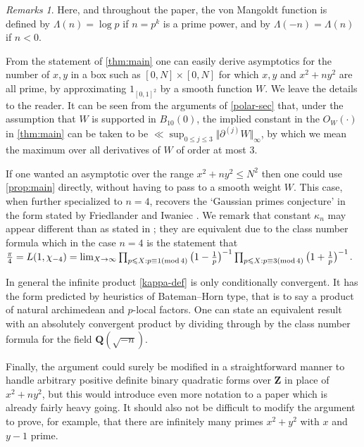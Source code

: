 \documentclass[11pt,reqno]{amsart}
\numberwithin{equation}{section}
\theoremstyle{definition}
\theoremstyle{remark}
\newtheorem*{remarks}{Remarks}
\renewcommand{\le}{\leqslant}
\newcommand\Z{\mathbf{Z}}
\newcommand\Q{\mathbf{Q}}
\newcommand{\mdsub}[1]{\ensuremath{(\mbox{\scriptsize mod}\, #1)}}
\begin{document}
\begin{remarks} 
Here, and throughout the paper, the von Mangoldt function is defined by $\Lambda(n) = \log p$ if $n = p^k$ is a prime power, and by $\Lambda(-n) = \Lambda(n)$ if $n < 0$. 

From the statement of \cref{thm:main} one can easily derive asymptotics for the number of $x,y$ in a box such as $[0,N] \times [0,N]$ for which $x,y$ and $x^2 + ny^2$ are all prime, by approximating $1_{[0,1]^2}$ by a smooth function $W$. We leave the details to the reader. It can be seen from the arguments of \cref{polar-sec} that, under the assumption that $W$ is supported in $B_{10}(0)$, the implied constant in the $O_W( \cdot )$ in \cref{thm:main} can be taken to be $\ll \sup_{0 \le j \le 3}\Vert \partial^{(j)}W  \Vert_{\infty}$, by which we mean the maximum over all derivatives of $W$ of order at most $3$. 

If one wanted an asymptotic over the range $x^2 + ny^2 \le N^2$ then one could use \cref{prop:main} directly, without having to pass to a smooth weight $W$. This case, when further specialized to $n=4$, recovers the `Gaussian primes conjecture' in the form stated by Friedlander and Iwaniec \cite[Conjecture 1.1]{FI22}. We remark that constant $\kappa_n$ may appear different than as stated in \cite{FI22}; they are equivalent due to the class number formula which in the case $n = 4$ is the statement that $\frac{\pi}{4} =  L(1,\chi_{-4}) = \lim_{X \rightarrow \infty}\prod_{p \le X : p \equiv 1 \mdsub{4}} \big(1 - \frac{1}{p}\big)^{-1} \prod_{p \le X: p \equiv 3 \mdsub 4}\big(1 + \frac{1}{p}\big)^{-1}$. 

In general the infinite product \cref{kappa-def} is only conditionally convergent.  It has the form predicted by heuristics of Bateman--Horn type, that is to say a product of natural archimedean and $p$-local factors. One can state an equivalent result with an absolutely convergent product by dividing through by the class number formula for the field $\Q(\sqrt{-n})$. 

Finally, the argument could surely be modified in a straightforward manner to handle arbitrary positive definite binary quadratic forms over $\Z$ in place of $x^2 + ny^2$, but this would introduce even more notation to a paper which is already fairly heavy going. It should also not be difficult to modify the argument to prove, for example, that there are infinitely many primes $x^2 + y^2$ with $x$ and $y - 1$ prime.
\end{remarks}
\end{document}
